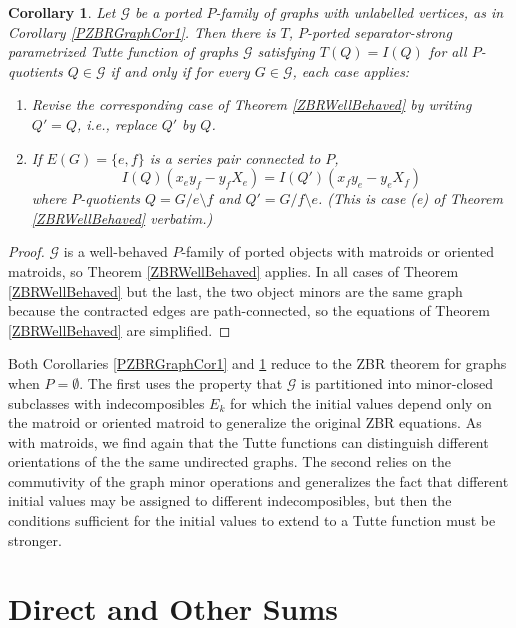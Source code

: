 \documentclass[12pt,leqno]{amsart}
\newtheorem{cor}[lem]{Corollary}
\theoremstyle{remark}
\begin{document}
\begin{cor}
\label{PZBRGraphCor2}
Let $\mathcal{G}$ be a ported $P$-family of graphs with
unlabelled vertices, as in Corollary \ref{PZBRGraphCor1}.
Then there is $T$, $P$-ported separator-strong parametrized Tutte function
of graphs $\mathcal{G}$ satisfying $T(Q)=I(Q)$ 
for all $P$-quotients $Q\in\mathcal{G}$ if and only if 
for every $G\in\mathcal{G}$, each case applies:
\begin{enumerate}
\item[a-d]
Revise the corresponding case of Theorem \ref{ZBRWellBehaved}
by writing $Q'=Q$, i.e., replace $Q'$ by $Q$.
\item[e]
If $E(G)=\{e,f\}$ is a series pair connected to $P$, 
\[
I(Q)(x_e y_f - y_f X_e) = 
I(Q')(x_f y_e - y_e X_f)
\]
where $P$-quotients
$Q=G/e\setminus f$ 
and $Q'=G/f\setminus e$.  (This is case (e) of Theorem \ref{ZBRWellBehaved}
\emph{verbatim}.)
\end{enumerate}
\end{cor}

\begin{proof}
$\mathcal{G}$ is a well-behaved $P$-family of ported objects
with matroids or oriented matroids, so Theorem \ref{ZBRWellBehaved}
applies.
In all cases of Theorem \ref{ZBRWellBehaved} but the
last, the two object minors are the same graph 
because the contracted edges are path-connected,
so the equations of Theorem \ref{ZBRWellBehaved} are simplified.
\end{proof}

Both Corollaries \ref{PZBRGraphCor1} and \ref{PZBRGraphCor2} reduce
to the ZBR theorem for graphs when $P=\emptyset$.  The first
uses the property that $\mathcal{G}$ is partitioned into
minor-closed subclasses with indecomposibles $E_k$ 
for which the
initial values depend only on the matroid or oriented matroid to generalize
the original ZBR equations.  As with matroids, we find again that
the Tutte functions can distinguish different orientations of the 
the same undirected graphs.
The second relies on the 
commutivity of the graph minor operations and generalizes
the fact that different initial values may be assigned to
different indecomposibles, but then the 
conditions sufficient for the initial values to
extend to a Tutte function must be stronger.





\section{Direct and Other Sums}
\end{document}
